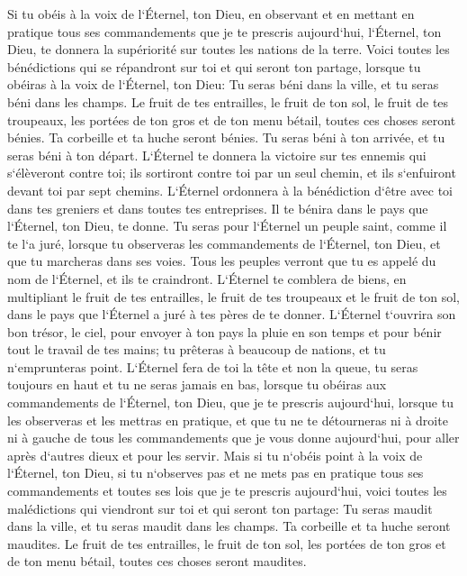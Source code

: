 \verse Si tu obéis à la voix de l`Éternel, ton Dieu, en observant et en mettant en pratique tous ses commandements que je te prescris aujourd`hui, l`Éternel, ton Dieu, te donnera la supériorité sur toutes les nations de la terre. 
\verse Voici toutes les bénédictions qui se répandront sur toi et qui seront ton partage, lorsque tu obéiras à la voix de l`Éternel, ton Dieu: 
\verse Tu seras béni dans la ville, et tu seras béni dans les champs. 
\verse Le fruit de tes entrailles, le fruit de ton sol, le fruit de tes troupeaux, les portées de ton gros et de ton menu bétail, toutes ces choses seront bénies. 
\verse Ta corbeille et ta huche seront bénies. 
\verse Tu seras béni à ton arrivée, et tu seras béni à ton départ. 
\verse L`Éternel te donnera la victoire sur tes ennemis qui s`élèveront contre toi; ils sortiront contre toi par un seul chemin, et ils s`enfuiront devant toi par sept chemins. 
\verse L`Éternel ordonnera à la bénédiction d`être avec toi dans tes greniers et dans toutes tes entreprises. Il te bénira dans le pays que l`Éternel, ton Dieu, te donne. 
\verse Tu seras pour l`Éternel un peuple saint, comme il te l`a juré, lorsque tu observeras les commandements de l`Éternel, ton Dieu, et que tu marcheras dans ses voies. 
\verse Tous les peuples verront que tu es appelé du nom de l`Éternel, et ils te craindront. 
\verse L`Éternel te comblera de biens, en multipliant le fruit de tes entrailles, le fruit de tes troupeaux et le fruit de ton sol, dans le pays que l`Éternel a juré à tes pères de te donner. 
\verse L`Éternel t`ouvrira son bon trésor, le ciel, pour envoyer à ton pays la pluie en son temps et pour bénir tout le travail de tes mains; tu prêteras à beaucoup de nations, et tu n`emprunteras point. 
\verse L`Éternel fera de toi la tête et non la queue, tu seras toujours en haut et tu ne seras jamais en bas, lorsque tu obéiras aux commandements de l`Éternel, ton Dieu, que je te prescris aujourd`hui, lorsque tu les observeras et les mettras en pratique, 
\verse et que tu ne te détourneras ni à droite ni à gauche de tous les commandements que je vous donne aujourd`hui, pour aller après d`autres dieux et pour les servir. 
\verse Mais si tu n`obéis point à la voix de l`Éternel, ton Dieu, si tu n`observes pas et ne mets pas en pratique tous ses commandements et toutes ses lois que je te prescris aujourd`hui, voici toutes les malédictions qui viendront sur toi et qui seront ton partage: 
\verse Tu seras maudit dans la ville, et tu seras maudit dans les champs. 
\verse Ta corbeille et ta huche seront maudites. 
\verse Le fruit de tes entrailles, le fruit de ton sol, les portées de ton gros et de ton menu bétail, toutes ces choses seront maudites. 
